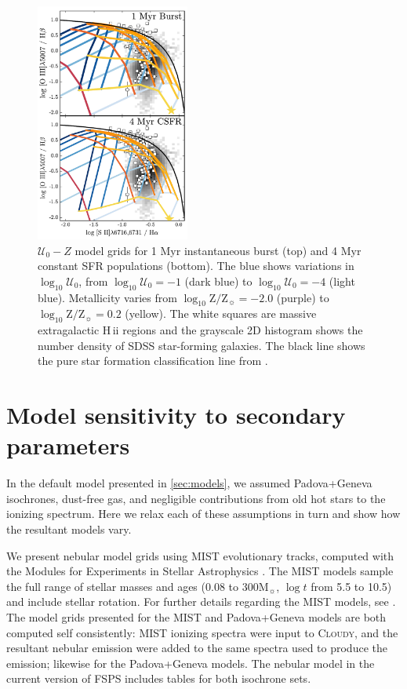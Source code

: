 \documentclass[twocolumn, tighten]{aastex61}
\newcommand{\Sec}[1]{\autoref{sec:#1}}
\newcommand{\FSPS}{{\sc FSPS}\xspace}
\newcommand{\Cloudy}{\textsc{Cloudy}\xspace}
\newcommand{\logten}{\ensuremath{\log_{10}}}
\newcommand\Msun{\ensuremath{\mathrm{M_{\sun}}}}
\newcommand{\hii}{H\,{\sc ii}\xspace}
\newcommand{\logZeq}[1]{\ensuremath{\logten \mathrm{Z}/\mathrm{Z}_{\sun} = #1}}
\newcommand{\U}{\ensuremath{\mathcal{U}_{0}}}
\newcommand{\logU}{\ensuremath{\logten \mathcal{U}_0}}
\begin{document}
\begin{figure}[H!]
  \begin{centering}
    \includegraphics[width=0.45\textwidth]{f20b.pdf}
    \caption{$\U-Z$ model grids for 1 Myr instantaneous burst (top) and 4 Myr constant SFR populations (bottom). The blue shows variations in \logU{}, from $\logU{}=-1$ (dark blue) to $\logU{}=-4$ (light blue). Metallicity varies from \logZeq{-2.0} (purple) to \logZeq{0.2} (yellow). The white squares are massive extragalactic \hii regions and the grayscale 2D histogram shows the number density of SDSS star-forming galaxies. The black line shows the pure star formation classification line from \citet{Kauffmann03a}.}
    \label{fig:alt2}
  \end{centering}
\end{figure}

\section{Model sensitivity to secondary parameters}\label{sec:secondary}

In the default model presented in \Sec{models}, we assumed Padova+Geneva isochrones, dust-free gas, and negligible contributions from old hot stars to the ionizing spectrum. Here we relax each of these assumptions in turn and show how the resultant models vary.

We present nebular model grids using MIST evolutionary tracks, computed with the Modules for Experiments in Stellar Astrophysics \citep[MESA,][]{Paxton11}. The MIST models sample the full range of stellar masses and ages (0.08 to 300\Msun{}, $\log t$ from 5.5 to 10.5) and include stellar rotation. For further details regarding the MIST models, see \citet{Choi16}. The model grids presented for the MIST and Padova+Geneva models are both computed self consistently: MIST ionizing spectra were input to \Cloudy, and the resultant nebular emission were added to the same spectra used to produce the emission; likewise for the Padova+Geneva models. The nebular model in the current version of \FSPS includes tables for both isochrone sets.
\end{document}
